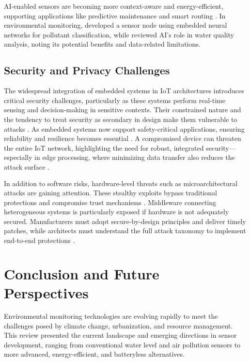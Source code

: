 \documentclass[conference]{IEEEtran}
\begin{document}
AI-enabled sensors are becoming more context-aware and energy-efficient, supporting applications like predictive maintenance and smart routing \cite{mukhopadhyay_2021_artificial}. In environmental monitoring, \cite{ferreira_2023_conception} developed a sensor node using embedded neural networks for pollutant classification, while \cite{nr_2025_ai} reviewed AI's role in water quality analysis, noting its potential benefits and data-related limitations.

\subsection{Security and Privacy Challenges}

The widespread integration of embedded systems in IoT architectures introduces critical security challenges, particularly as these systems perform real-time sensing and decision-making in sensitive contexts. Their constrained nature and the tendency to treat security as secondary in design make them vulnerable to attacks \cite{pimentel_2017_exploring}. As embedded systems now support safety-critical applications, ensuring reliability and resilience becomes essential \cite{koulamas_2018_realtime}. A compromised device can threaten the entire IoT network, highlighting the need for robust, integrated security—especially in edge processing, where minimizing data transfer also reduces the attack surface \cite{tien_2017_internet}.

In addition to software risks, hardware-level threats such as microarchitectural attacks are gaining attention. These stealthy exploits bypass traditional protections and compromise trust mechanisms \cite{fournaris_2017_exploiting}. Middleware connecting heterogeneous systems is particularly exposed if hardware is not adequately secured. Manufacturers must adopt secure-by-design principles and deliver timely patches, while architects must understand the full attack taxonomy to implement end-to-end protections \cite{fournaris_2017_exploiting, pimentel_2017_exploring}.

\section{Conclusion and Future Perspectives} \label{cap:conclusion}

Environmental monitoring technologies are evolving rapidly to meet the challenges posed by climate change, urbanization, and resource management. This review presented the current landscape and emerging directions in sensor development, ranging from conventional water level and air pollution sensors to more advanced, energy-efficient, and batteryless alternatives.
\end{document}
